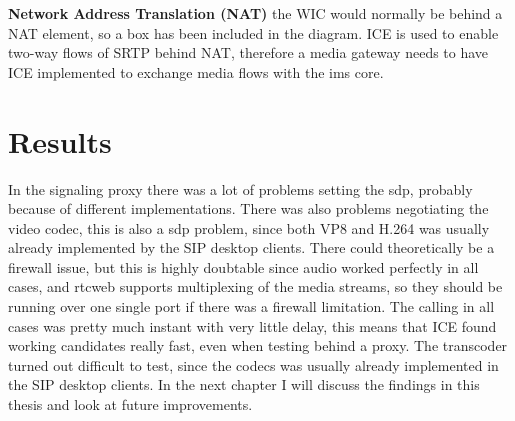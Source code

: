 \textbf{Network Address Translation (NAT)}
the WIC would normally be behind a NAT element, so a box has been included in the diagram. ICE is used to enable two-way flows of SRTP behind NAT, therefore a media gateway needs to have ICE implemented to exchange media flows with the \gls{ims} core.

\section{Results}
In the signaling proxy there was a lot of problems setting the \gls{sdp}, probably because of different implementations. There was also problems negotiating the video codec, this is also a \gls{sdp} problem, since both VP8 and H.264 was usually already implemented by the SIP desktop clients. There could theoretically be a firewall issue, but this is highly doubtable since audio worked perfectly in all cases, and \gls{rtcweb} supports multiplexing of the media streams, so they should be running over one single port if there was a firewall limitation. The calling in all cases was pretty much instant with very little delay, this means that ICE found working candidates really fast, even when testing behind a proxy. The transcoder turned out difficult to test, since the codecs was usually already implemented in the SIP desktop clients. In the next chapter I will discuss the findings in this thesis and look at future improvements.